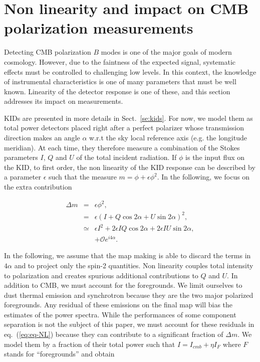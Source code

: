 
{\color{blue}
\section{Non linearity and impact on CMB polarization measurements}
\label{sec:cmb}

Detecting CMB polarization $B$ modes is one of the major goals of modern
cosmology. However, due to the faintness of the expected signal, systematic
effects must be controlled to challenging low levels. In this context, the
knowledge of instrumental characteristics is one of many parameters that must be
well known. Linearity of the detector response is one of these,
and this section addresses its impact on measurements.

KIDs are presented in more details in Sect.~\ref{se:kids}. For now, we model
them as total power detectors placed right after a perfect polarizer whose
transmission direction makes an angle $\alpha$ w.r.t the sky local reference
axis (e.g. the longitude meridian). At each time, they therefore measure a
combination of the Stokes parameters $I$, $Q$ and $U$ of the total incident
radiation. If $\phi$ is the input flux on the KID, to first order, the non
linearity of the KID response can be described by a parameter $\epsilon$ such
that the measure $m=\phi + \epsilon\phi^2$. In the following, we focus on the
extra contribution

\begin{eqnarray}
\Delta m &=& \epsilon\phi^2, \nonumber \\
&=& \epsilon(I+Q\cos2\alpha+U\sin2\alpha)^2, \nonumber\\
 &\simeq & \epsilon I^{2} + 2\epsilon IQ\cos2\alpha + 
2\epsilon IU \sin2\alpha,\nonumber\\
&& + \mathcal{O}e^{i4\alpha}.
\label{eq:eq-NL}
\end{eqnarray}

In the following, we assume that the map making is able to discard the terms in
$4\alpha$ and to project only the spin-2 quantities. Non linearity couples total
intensity to polarization and creates spurious additional contributions to $Q$
and $U$. In addition to CMB, we must account for the foregrounds. We limit
ourselves to dust thermal emission and synchrotron because they are the two
major polarized foregrounds. Any residual of these emissions on the final map
will bias the estimates of the power spectra. While the performances of some
component separation is not the subject of this paper, we must account for these
residuals in eq.~(\ref{eq:eq-NL}) because they can contribute to a significant
fraction of $\Delta m$. We model them by a fraction of their total power such
that $I = I_{cmb} + \eta I_F$ where $F$ stands for ``foregrounds'' and obtain

}
